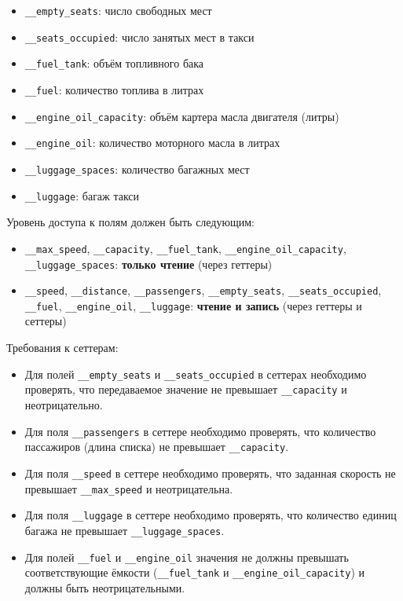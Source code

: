 \begin{enumerate}
\begin{itemize}
    \item \texttt{\_\_empty\_seats}: число свободных мест  
    \item \texttt{\_\_seats\_occupied}: число занятых мест в такси  
    \item \texttt{\_\_fuel\_tank}: объём топливного бака  
    \item \texttt{\_\_fuel}: количество топлива в литрах  
    \item \texttt{\_\_engine\_oil\_capacity}: объём картера масла двигателя (литры)  
    \item \texttt{\_\_engine\_oil}: количество моторного масла в литрах  
    \item \texttt{\_\_luggage\_spaces}: количество багажных мест  
    \item \texttt{\_\_luggage}: багаж такси  
\end{itemize}
Уровень доступа к полям должен быть следующим:
\begin{itemize}
    \item \texttt{\_\_max\_speed}, \texttt{\_\_capacity}, \texttt{\_\_fuel\_tank}, \texttt{\_\_engine\_oil\_capacity}, \texttt{\_\_luggage\_spaces}: \textbf{только чтение} (через геттеры)  
    \item \texttt{\_\_speed}, \texttt{\_\_distance}, \texttt{\_\_passengers}, \texttt{\_\_empty\_seats}, \texttt{\_\_seats\_occupied}, \texttt{\_\_fuel}, \texttt{\_\_engine\_oil}, \texttt{\_\_luggage}: \textbf{чтение и запись} (через геттеры и сеттеры)
\end{itemize}
Требования к сеттерам:
\begin{itemize}
    \item Для полей \texttt{\_\_empty\_seats} и \texttt{\_\_seats\_occupied} в сеттерах необходимо проверять, что передаваемое значение не превышает \texttt{\_\_capacity} и неотрицательно.  
    \item Для поля \texttt{\_\_passengers} в сеттере необходимо проверять, что количество пассажиров (длина списка) не превышает \texttt{\_\_capacity}.  
    \item Для поля \texttt{\_\_speed} в сеттере необходимо проверять, что заданная скорость не превышает \texttt{\_\_max\_speed} и неотрицательна.  
    \item Для поля \texttt{\_\_luggage} в сеттере необходимо проверять, что количество единиц багажа не превышает \texttt{\_\_luggage\_spaces}.
    \item Для полей \texttt{\_\_fuel} и \texttt{\_\_engine\_oil} значения не должны превышать соответствующие ёмкости (\texttt{\_\_fuel\_tank} и \texttt{\_\_engine\_oil\_capacity}) и должны быть неотрицательными.

\end{itemize}
\end{enumerate}
